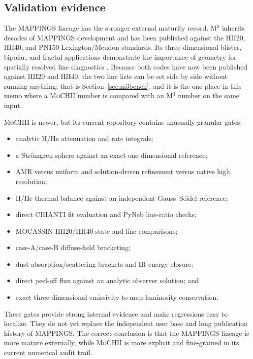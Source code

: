 \documentclass[english,a4paper]{my_memo}
\newcommand{\MoCHII}{\textsc{MoCHII}}
\newcommand{\Mthree}{M$^3$}
\begin{document}
\subsection{Validation evidence}
\label{sec:validation}

The MAPPINGS lineage has the stronger external maturity record.  \Mthree{}
inherits decades of MAPPINGS development and has been published against the HII20, HII40,
and PN150 Lexington/Meudon standards.  Its three-dimensional blister,
bipolar, and fractal applications demonstrate the importance of geometry
for spatially resolved line diagnostics \cite{jin2022,jin2022fractal}.
Because both codes have now been published against HII20 and HII40, the
two line lists can be set side by side without running anything; that is
Section~\ref{sec:m3bench}, and it is the one place in this memo where a
\MoCHII{} number is compared with an \Mthree{} number on the same input.

\MoCHII{} is newer, but its current repository contains unusually granular
gates:

\begin{itemize}[leftmargin=2em]
\item analytic H/He attenuation and rate integrals;
\item a Str\"omgren sphere against an exact one-dimensional reference;
\item AMR versus uniform and solution-driven refinement versus native high
  resolution;
\item H/He thermal balance against an independent Gauss--Seidel reference;
\item direct CHIANTI fit evaluation and PyNeb line-ratio checks;
\item MOCASSIN HII20/HII40 state and line comparisons;
\item case-A/case-B diffuse-field bracketing;
\item dust absorption/scattering brackets and IR energy closure;
\item direct peel-off flux against an analytic observer solution; and
\item exact three-dimensional emissivity-to-map luminosity conservation.
\end{itemize}

These gates provide strong internal evidence and make regressions easy to
localize.  They do not yet replace the independent user base and long
publication history of MAPPINGS.  The correct conclusion is that
the MAPPINGS lineage is more mature externally, while \MoCHII{} is more explicit and
fine-grained in its current numerical audit trail.
\end{document}
